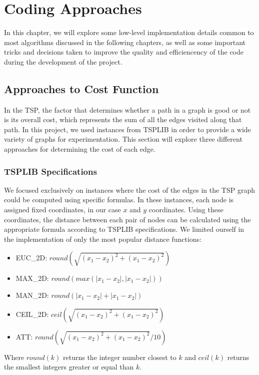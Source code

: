\chapter{Coding Approaches}

In this chapter, we will explore some low-level implementation details common to most algorithms discussed in the following chapters, as well as some important tricks and decisions taken to improve the quality and efficiencency of the code during the development of the project.

\section{Approaches to Cost Function}

In the TSP, the factor that determines whether a path in a graph is good or not is its overall cost, which represents the sum of all the edges visited along that path.
In this project, we used instances from TSPLIB\cite{tsplib} in order to provide a wide variety of graphs for experimentation.
This section will explore three different approaches for determining the cost of each edge.

\subsection{TSPLIB Specifications}

We focused exclusively on instances where the cost of the edges in the TSP graph could be computed using specific formulas.
In these instances, each node is assigned fixed coordinates, in our case $x$ and $y$ coordinates.
Using these coordinates, the distance between each pair of nodes can be calculated using the appropriate formula according to TSPLIB specifications.
We limited ourself in the implementation of only the most popular distance functions:
\begin{itemize}
    \item EUC\_2D: $round(\sqrt{(x_1 - x_2)^2 + (x_1 - x_2)^2})$
    \item MAX\_2D: $round(max(|x_1 - x_2|,|x_1 - x_2|))$
    \item MAN\_2D: $round(|x_1 - x_2| + |x_1 - x_2|)$
    \item CEIL\_2D: $ceil(\sqrt{(x_1 - x_2)^2 + (x_1 - x_2)^2})$
    \item ATT: \qquad $round(\sqrt{(x_1 - x_2)^2 + (x_1 - x_2)^2}/10)$
\end{itemize}
Where $round(k)$ returns the integer number closest to $k$ and $ceil(k)$ returns the smallest integers greater or equal than $k$.

